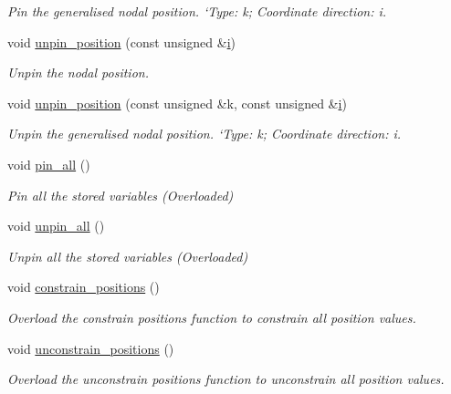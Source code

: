 \begin{DoxyCompactItemize}
\begin{DoxyCompactList}\small\item\em Pin the generalised nodal position. `\+Type\textquotesingle{}\+: k; Coordinate direction\+: i. \end{DoxyCompactList}\item 
void \hyperlink{classoomph_1_1SolidNode_ab43707b1893ca89e684609f045ea8101}{unpin\+\_\+position} (const unsigned \&\hyperlink{cfortran_8h_adb50e893b86b3e55e751a42eab3cba82}{i})
\begin{DoxyCompactList}\small\item\em Unpin the nodal position. \end{DoxyCompactList}\item 
void \hyperlink{classoomph_1_1SolidNode_a3c9577dbae23ec836abf47bf49ea745f}{unpin\+\_\+position} (const unsigned \&k, const unsigned \&\hyperlink{cfortran_8h_adb50e893b86b3e55e751a42eab3cba82}{i})
\begin{DoxyCompactList}\small\item\em Unpin the generalised nodal position. `\+Type\textquotesingle{}\+: k; Coordinate direction\+: i. \end{DoxyCompactList}\item 
void \hyperlink{classoomph_1_1SolidNode_ab051ba65aed07fe75f6cfd9b32de62cc}{pin\+\_\+all} ()
\begin{DoxyCompactList}\small\item\em Pin all the stored variables (Overloaded) \end{DoxyCompactList}\item 
void \hyperlink{classoomph_1_1SolidNode_a0df372aae692d679cfceeb46fb5783a9}{unpin\+\_\+all} ()
\begin{DoxyCompactList}\small\item\em Unpin all the stored variables (Overloaded) \end{DoxyCompactList}\item 
void \hyperlink{classoomph_1_1SolidNode_a08b51c4154b8c399fa021d948ad36b98}{constrain\+\_\+positions} ()
\begin{DoxyCompactList}\small\item\em Overload the constrain positions function to constrain all position values. \end{DoxyCompactList}\item 
void \hyperlink{classoomph_1_1SolidNode_a1959abfbb37f775a4d6808ceb9afd421}{unconstrain\+\_\+positions} ()
\begin{DoxyCompactList}\small\item\em Overload the unconstrain positions function to unconstrain all position values. \end{DoxyCompactList}\item 

\end{DoxyCompactItemize}
